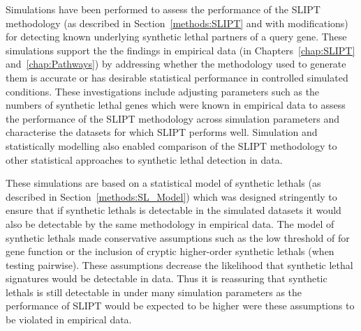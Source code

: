 Simulations have been performed to assess the performance of the \gls{SLIPT} methodology (as described in Section~\ref{methods:SLIPT} and with modifications) for detecting known underlying \gls{synthetic lethal} partners of a query gene. These simulations support the the findings in empirical data (in Chapters~\ref{chap:SLIPT} and~\ref{chap:Pathways}) by addressing whether the methodology used to generate them is accurate or has desirable statistical performance in controlled simulated conditions. These investigations include adjusting parameters such as the numbers of \gls{synthetic lethal} genes which were known in empirical data to assess the performance of the \gls{SLIPT} methodology across simulation parameters and characterise the datasets for which \gls{SLIPT} performs well. Simulation and statistically modelling also enabled comparison of the \gls{SLIPT} methodology to other statistical approaches to \gls{synthetic lethal} detection in  data.

These simulations are based on a statistical model of \glspl{synthetic lethal} (as described in Section~\ref{methods:SL_Model}) which was designed stringently to ensure that if \glspl{synthetic lethal} is detectable in the simulated datasets it would also be detectable by the same methodology in empirical  data. The model of \glspl{synthetic lethal} made conservative assumptions such as the low threshold of  for gene function or the inclusion of cryptic higher-order \glspl{synthetic lethal} (when testing pairwise). These assumptions decrease the likelihood that \gls{synthetic lethal} signatures would be detectable in  data. Thus it is reassuring that \glspl{synthetic lethal} is still detectable in under many simulation parameters as the performance of \gls{SLIPT} would be expected to be higher were these assumptions to be violated in empirical data.


